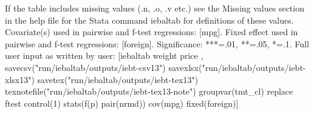 If the table includes missing values (.n, .o, .v etc.) see the Missing values section in the help file for the Stata command iebaltab for definitions of these values. Covariate(s) used in pairwise and f-test regressions: [mpg]. Fixed effect used in pairwise and f-test regressions: [foreign]. Significance: ***=.01, **=.05, *=.1. Full user input as written by user: [iebaltab weight price , savecsv("run/iebaltab/outputs/iebt-csv13") savexlsx("run/iebaltab/outputs/iebt-xlsx13") savetex("run/iebaltab/outputs/iebt-tex13") texnotefile("run/iebaltab/outputs/iebt-tex13-note") groupvar(tmt\_cl) replace ftest control(1) stats(f(p) pair(nrmd)) cov(mpg) fixed(foreign)] 
